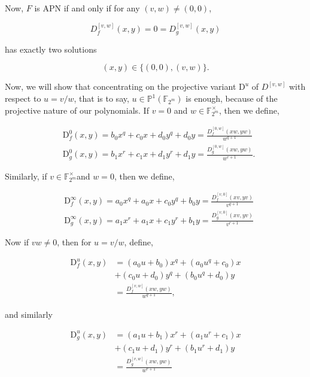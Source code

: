 \documentclass[10pt]{article}
\begin{document}
Now, $F$ is APN if and only if for any $(v, w) \neq(0,0)$,

$$
D_{f}^{[v, w]}(x, y)=0=D_{g}^{[v, w]}(x, y)
$$

has exactly two solutions

$$
(x, y) \in\{(0,0),(v, w)\} .
$$

Now, we will show that concentrating on the projective variant $\mathrm{D}^{u}$ of $D^{[v, w]}$ with respect to $u=v / w$, that is to say, $u \in \mathbb{P}^{1}\left(\mathbb{F}_{2^{m}}\right)$ is enough, because of the projective nature of our polynomials. If $v=0$ and $w \in \mathbb{F}_{2^{m}}^{\times}$, then we define,

$$
\begin{aligned}
& \mathrm{D}_{f}^{0}(x, y)=b_{0} x^{q}+c_{0} x+d_{0} y^{q}+d_{0} y=\frac{D_{f}^{[0, w]}(x w, y w)}{w^{q+1}} \\
& \mathrm{D}_{g}^{0}(x, y)=b_{1} x^{r}+c_{1} x+d_{1} y^{r}+d_{1} y=\frac{D_{g}^{[0, w]}(x w, y w)}{w^{r+1}} .
\end{aligned}
$$

Similarly, if $v \in \mathbb{F}_{2^{m}}^{\times}$and $w=0$, then we define,

$$
\begin{aligned}
& \mathrm{D}_{f}^{\infty}(x, y)=a_{0} x^{q}+a_{0} x+c_{0} y^{q}+b_{0} y=\frac{D_{f}^{[v, 0]}(x v, y v)}{v^{q+1}} \\
& \mathrm{D}_{g}^{\infty}(x, y)=a_{1} x^{r}+a_{1} x+c_{1} y^{r}+b_{1} y=\frac{D_{g}^{[v, 0]}(x v, y v)}{v^{r+1}}
\end{aligned}
$$

Now if $v w \neq 0$, then for $u=v / w$, define,

$$
\begin{aligned}
\mathrm{D}_{f}^{u}(x, y) & =\left(a_{0} u+b_{0}\right) x^{q}+\left(a_{0} u^{q}+c_{0}\right) x \\
& +\left(c_{0} u+d_{0}\right) y^{q}+\left(b_{0} u^{q}+d_{0}\right) y \\
& =\frac{D_{f}^{[v, w]}(x w, y w)}{w^{q+1}},
\end{aligned}
$$

and similarly

$$
\begin{aligned}
\mathrm{D}_{g}^{u}(x, y) & =\left(a_{1} u+b_{1}\right) x^{r}+\left(a_{1} u^{r}+c_{1}\right) x \\
& +\left(c_{1} u+d_{1}\right) y^{r}+\left(b_{1} u^{r}+d_{1}\right) y \\
& =\frac{D_{g}^{[v, w]}(x w, y w)}{w^{r+1}}
\end{aligned}
$$
\end{document}
